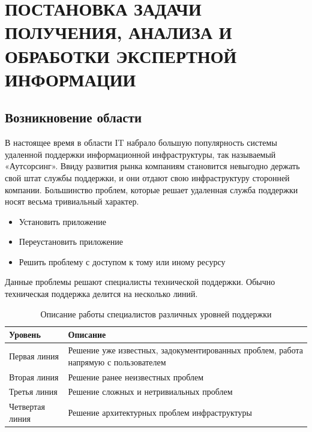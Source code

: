 \chapter{ПОСТАНОВКА ЗАДАЧИ ПОЛУЧЕНИЯ, АНАЛИЗА И ОБРАБОТКИ ЭКСПЕРТНОЙ ИНФОРМАЦИИ} \label{chapt1}

\section{Возникновение области} \label{sect1_1}
В настоящее время в области IT набрало большую популярность системы удаленной поддержки информационной инфраструктуры, так называемый «Аутсорсинг». Ввиду развития рынка компаниям становится невыгодно держать свой штат службы поддержки, и они отдают свою инфраструктуру сторонней компании.
Большинство проблем, которые решает удаленная служба поддержки носят весьма тривиальный характер.

\begin{itemize}
	\item Установить приложение
	\item Переустановить приложение
	\item Решить проблему с доступом к тому или иному ресурсу
\end{itemize}
Данные проблемы решают специалисты технической поддержки. Обычно техническая поддержка делится на несколько линий.

\begin{table} [htbp]
  \centering
  \parbox{15cm}{\caption{Описание работы специалистов различных уровней поддержки}\label{TSSDescription}}
  \begin{tabular}{| p{7cm} || p{7cm} |}
  \hline
  \hline
Уровень & Описание \\
  \hline
    \hline

Первая линия	& Решение уже известных, задокументированных проблем, работа напрямую с пользователем \\
  \hline

Вторая линия  & Решение ранее неизвестных проблем \\
  \hline

Третья линия & Решение сложных и нетривиальных проблем \\
  \hline

Четвертая линия  & Решение архитектурных проблем инфраструктуры \\

  \hline
  \hline
  \end{tabular}
\end{table}


